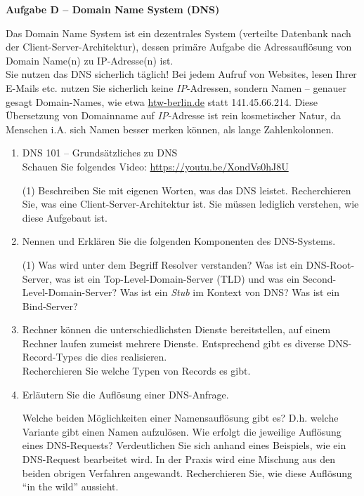 \documentclass[paper=a4,fontsize=11pt]{scrartcl}%
\numberwithin{equation}{section}
\begin{document}
\begin{center}\Large{\textbf{Aufgabe D -- Domain Name System (DNS)}}\end{center}\vskip0.25in
Das Domain Name System ist ein dezentrales System (verteilte Datenbank nach der Client-Server-Architektur), dessen primäre Aufgabe die Adressauflösung von Domain Name(n) zu IP-Adresse(n) ist.\\
Sie nutzen das DNS sicherlich täglich! Bei jedem Aufruf von Websites, lesen Ihrer E-Mails etc. nutzen Sie sicherlich keine \emph{IP}-Adressen, sondern Namen -- genauer gesagt Domain-Names, wie etwa \url{htw-berlin.de} statt 141.45.66.214. Diese Übersetzung von Domainname auf \emph{IP}-Adresse ist rein kosmetischer Natur, da Menschen i.A. sich Namen besser merken können, als lange Zahlenkolonnen.
\begin{enumerate}
	\item DNS 101 -- Grundsätzliches zu DNS\\
	Schauen Sie folgendes Video: \url{https://youtu.be/XondVs0hJ8U}
	\begin{tasks}(1)
		\task Beschreiben Sie mit eigenen Worten, was das DNS leistet.
		\task Recherchieren Sie, was eine Client-Server-Architektur ist. Sie müssen lediglich verstehen, wie diese Aufgebaut ist.
	\end{tasks}
	\item Nennen und Erklären Sie die folgenden Komponenten des DNS-Systems.
	\begin{tasks}(1)
		\task Was wird unter dem Begriff Resolver verstanden?
		\task Was ist ein DNS-Root-Server, was ist ein Top-Level-Domain-Server (TLD) und was ein Second-Level-Domain-Server?
		\task Was ist ein \emph{Stub} im Kontext von DNS?
		\task Was ist ein Bind-Server?
	\end{tasks}
	\item Rechner können die unterschiedlichsten Dienste bereitstellen, auf einem Rechner laufen zumeist mehrere Dienste. Entsprechend gibt es diverse DNS-Record-Types die dies realisieren.\\
	Recherchieren Sie welche Typen von Records es gibt.
	\item Erläutern Sie die Auflösung einer DNS-Anfrage.
	\begin{tasks}
		\task Welche beiden Möglichkeiten einer Namensauflösung gibt es? D.h. welche Variante gibt einen Namen aufzulösen.
		\task Wie erfolgt die jeweilige Auflösung eines DNS-Requests?
		\task Verdeutlichen Sie sich anhand eines Beispiels, wie ein DNS-Request bearbeitet wird.
		\task In der Praxis wird eine Mischung aus den beiden obrigen Verfahren angewandt. Recherchieren Sie, wie diese Auflösung \enquote{in the wild} aussieht.

\end{tasks}
\end{enumerate}
\end{document}
